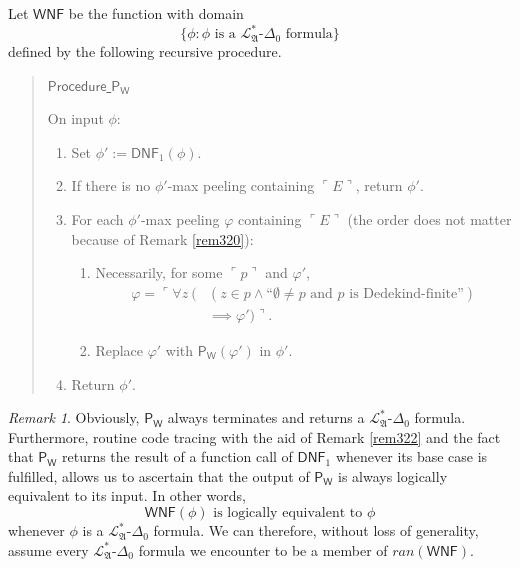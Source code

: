 \documentclass[12pt, twoside]{memoir}
\numberwithin{equation}{section}
\theoremstyle{definition}
\theoremstyle{remark}
\newtheorem{rem}[thm]{Remark}
\theoremstyle{definition}
\theoremstyle{definition}
\theoremstyle{definition}
\theoremstyle{remark}
\begin{document}
Let $\mathsf{WNF}$ be the function with domain
\begin{equation*}
    \{\phi: \phi \text{ is a } \mathcal{L}^{*}_{\mathfrak{A}}\text{-}\Delta_0 \text{ formula}\} 
\end{equation*} 
defined by the following recursive procedure.

\begin{quote}
    \underline{$\mathsf{Procedure}$ $\mathsf{P_W}$}

    On input $\phi$:
    \begin{enumerate}[label=(\arabic*)]
        \item Set $\phi' := \mathsf{DNF}_1(\phi)$.
        \item If there is no $\phi'$-max peeling containing $\ulcorner E \urcorner$, return $\phi'$.
        \item For each $\phi'$-max peeling $\varphi$ containing $\ulcorner E \urcorner$ (the order does not matter because of Remark \ref{rem320}):
        \begin{enumerate}[label=(F\arabic*), leftmargin=30pt]
            \item Necessarily, for some $\ulcorner p \urcorner$ and $\varphi'$,
                \begin{align*}
                    \varphi = \ulcorner \forall z \ ( & (z \in p \wedge \text{``}\emptyset \neq p \text{ and } p \text{ is Dedekind-finite''}) \\
                    & \implies \varphi') \urcorner \text{.}
                \end{align*}
            \item Replace $\varphi'$ with $\mathsf{P_W}(\varphi')$ in $\phi'$.
        \end{enumerate}
        \item Return $\phi'$.
    \end{enumerate}
\end{quote}

\begin{rem}\label{rem321}
Obviously, $\mathsf{P_W}$ always terminates and returns a $\mathcal{L}^{*}_{\mathfrak{A}}$-$\Delta_0$ formula. Furthermore, routine code tracing with the aid of Remark \ref{rem322} and the fact that $\mathsf{P_W}$ returns the result of a function call of $\mathsf{DNF}_1$ whenever its base case is fulfilled, allows us to ascertain that the output of $\mathsf{P_W}$ is always logically equivalent to its input. In other words, 
\begin{equation*}
    \mathsf{WNF}(\phi) \text{ is logically equivalent to } \phi
\end{equation*}
whenever $\phi$ is a $\mathcal{L}^{*}_{\mathfrak{A}}$-$\Delta_0$ formula. We can therefore, without loss of generality, assume every $\mathcal{L}^{*}_{\mathfrak{A}}$-$\Delta_0$ formula we encounter to be a member of $ran(\mathsf{WNF})$.
\end{rem}
\end{document}
